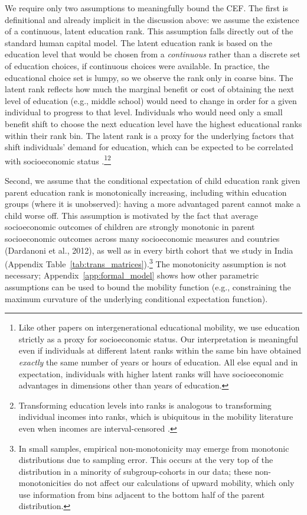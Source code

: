 \documentclass[12pt,letterpaper]{article}
\numberwithin{equation}{section}
\begin{document}
We require only two assumptions to meaningfully bound the CEF. The first is definitional and already implicit in the discussion above: we assume the existence of a continuous, latent education rank. This assumption falls directly out of the standard human capital model. The latent education rank is based on the education level that would be chosen from a \textit{continuous} rather than a discrete set of education choices, if continuous choices were available. In practice, the educational choice set is lumpy, so we observe the rank only in coarse bins. The latent rank reflects how much the marginal benefit or cost of obtaining the next level of education (e.g., middle school) would need to change in order for a given individual to progress to that level. Individuals who would need only a small benefit shift to choose the next education level have the highest educational ranks within their rank bin. The latent rank is a proxy for the underlying factors that shift individuals' demand for education, which can be expected to be correlated with socioeconomic status \cite{Card1999}.\footnote{Like other papers on intergenerational educational mobility, we use education strictly as a proxy for socioeconomic status. Our interpretation is meaningful even if individuals at different latent ranks within the same bin have obtained \textit{exactly} the same number of years or hours of education. All else equal and in expectation, individuals with higher latent ranks will have socioeconomic advantages in dimensions other than years of education.}\superscript{,}\footnote{Transforming education levels into ranks is analogous to transforming individual incomes into ranks, which is ubiquitous in the mobility literature even when incomes are interval-censored \cite{rosenbaum2000}.}

Second, we assume that the conditional expectation of child education rank given parent education rank is monotonically increasing, including within education groups (where it is unobserved): having a more advantaged parent cannot make a child worse off. This assumption is motivated by the fact that average socioeconomic outcomes of children are strongly monotonic in parent socioeconomic outcomes across many socioeconomic measures and countries (Dardanoni et al., 2012), as well as in every birth cohort that we study in India (Appendix Table~\ref{tab:trans_matrices}).\footnote{In small samples, empirical non-monotonicity may emerge from monotonic distributions due to sampling error. This occurs at the very top of the distribution in a minority of subgroup-cohorts in our data; these non-monotonicities do not affect our calculations of upward mobility, which only use information from bins adjacent to the bottom half of the parent distribution.} The monotonicity assumption is not necessary; Appendix~\ref{app:formal_model} shows how other parametric assumptions can be used to bound the mobility function (e.g., constraining the maximum curvature of the underlying conditional expectation function). 
\end{document}
